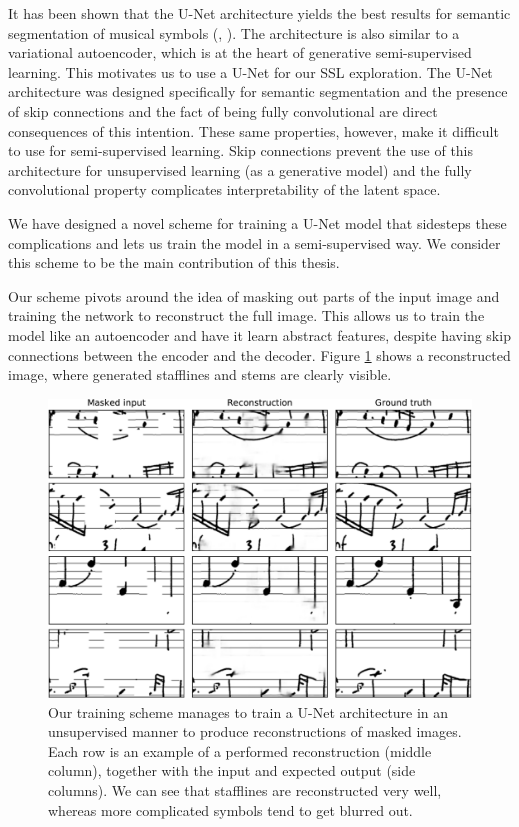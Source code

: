 It has been shown that the U-Net architecture yields the best results for semantic segmentation of musical symbols (\cite{UNet}, \cite{PachaBaseline}). The architecture is also similar to a variational autoencoder, which is at the heart of generative semi-supervised learning. This motivates us to use a U-Net for our SSL exploration. The U-Net architecture was designed specifically for semantic segmentation and the presence of skip connections and the fact of being fully convolutional are direct consequences of this intention. These same properties, however, make it difficult to use for semi-supervised learning. Skip connections prevent the use of this architecture for unsupervised learning (as a generative model) and the fully convolutional property complicates interpretability of the latent space.

We have designed a novel scheme for training a U-Net model that sidesteps these complications and lets us train the model in a semi-supervised way. We consider this scheme to be the main contribution of this thesis.

Our scheme pivots around the idea of masking out parts of the input image and training the network to reconstruct the full image. This allows us to train the model like an autoencoder and have it learn abstract features, despite having skip connections between the encoder and the decoder. Figure \ref{fig:Reconstructions} shows a reconstructed image, where generated stafflines and stems are clearly visible.

\begin{figure}[ht]
    \centering
    \includegraphics[width=145mm]{../../figures/06-noise/reconstructions.pdf}
    \caption{Our training scheme manages to train a U-Net architecture in an unsupervised manner to produce reconstructions of masked images. Each row is an example of a performed reconstruction (middle column), together with the input and expected output (side columns). We can see that stafflines are reconstructed very well, whereas more complicated symbols tend to get blurred out.}
    \label{fig:Reconstructions}
\end{figure}

